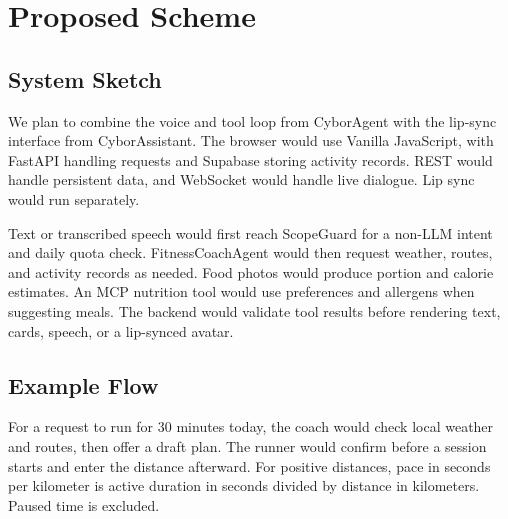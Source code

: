 \section{Proposed Scheme}\label{sec:method}
\subsection{System Sketch}
We plan to combine the voice and tool loop from CyborAgent with the lip-sync interface from CyborAssistant. The browser would use Vanilla JavaScript, with FastAPI handling requests and Supabase storing activity records. REST would handle persistent data, and WebSocket would handle live dialogue. Lip sync would run separately.

Text or transcribed speech would first reach ScopeGuard for a non-LLM intent and daily quota check. FitnessCoachAgent would then request weather, routes, and activity records as needed. Food photos would produce portion and calorie estimates. An MCP nutrition tool would use preferences and allergens when suggesting meals. The backend would validate tool results before rendering text, cards, speech, or a lip-synced avatar.


\subsection{Example Flow}
For a request to run for 30 minutes today, the coach would check local weather and routes, then offer a draft plan. The runner would confirm before a session starts and enter the distance afterward. For positive distances, pace in seconds per kilometer is active duration in seconds divided by distance in kilometers. Paused time is excluded.

